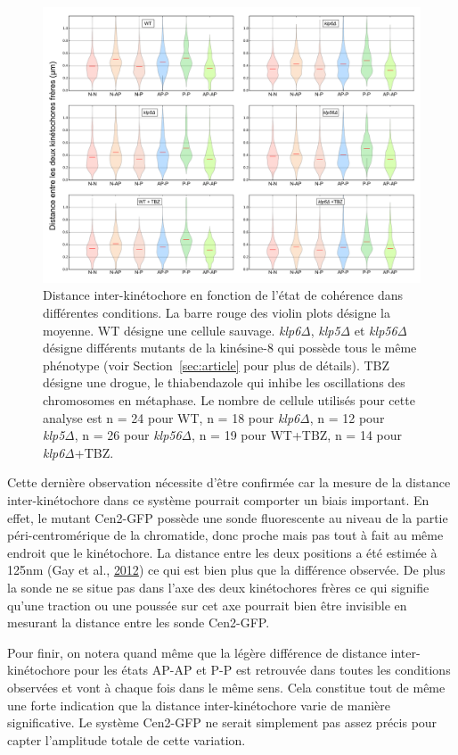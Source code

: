 \documentclass[12pt,a4paper,twoside,openright]{book}
\begin{document}
\begin{figure}[htbp]
\centering
\includegraphics{figures/results/imaging/coherence_stretch.png}
\caption{\label{fig:coherence_stretch}Distance inter-kinétochore en
fonction de l'état de cohérence dans différentes conditions. La barre
rouge des violin plots désigne la moyenne. WT désigne une cellule
sauvage. \emph{klp6Δ}, \emph{klp5Δ} et \emph{klp56Δ} désigne différents
mutants de la kinésine-8 qui possède tous le même phénotype (voir
Section~\ref{sec:article} pour plus de détails). TBZ désigne une drogue,
le thiabendazole qui inhibe les oscillations des chromosomes en
métaphase. Le nombre de cellule utilisés pour cette analyse est n = 24
pour WT, n = 18 pour \emph{klp6Δ}, n = 12 pour \emph{klp5Δ}, n = 26 pour
\emph{klp56Δ}, n = 19 pour WT+TBZ, n = 14 pour \emph{klp6Δ}+TBZ.}
\end{figure}

Cette dernière observation nécessite d'être confirmée car la mesure de
la distance inter-kinétochore dans ce système pourrait comporter un
biais important. En effet, le mutant Cen2-GFP possède une sonde
fluorescente au niveau de la partie péri-centromérique de la chromatide,
donc proche mais pas tout à fait au même endroit que le kinétochore. La
distance entre les deux positions a été estimée à 125nm (Gay et al.,
\protect\hyperlink{ref-Gay2012a}{2012}) ce qui est bien plus que la
différence observée. De plus la sonde ne se situe pas dans l'axe des
deux kinétochores frères ce qui signifie qu'une traction ou une poussée
sur cet axe pourrait bien être invisible en mesurant la distance entre
les sonde Cen2-GFP.

Pour finir, on notera quand même que la légère différence de distance
inter-kinétochore pour les états AP-AP et P-P est retrouvée dans toutes
les conditions observées et vont à chaque fois dans le même sens. Cela
constitue tout de même une forte indication que la distance
inter-kinétochore varie de manière significative. Le système Cen2-GFP ne
serait simplement pas assez précis pour capter l'amplitude totale de
cette variation.
\end{document}
